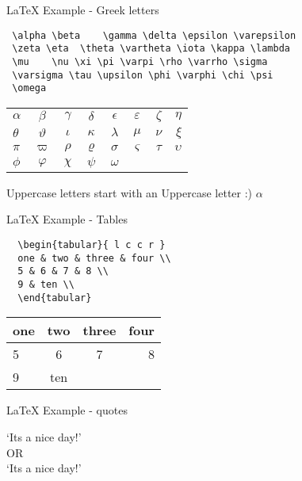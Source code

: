 \begin{frame}[t,fragile]{LaTeX Example - Greek letters}

  \begin{lstlisting}
 \alpha \beta	 \gamma \delta \epsilon \varepsilon
 \zeta \eta	 \theta \vartheta \iota \kappa \lambda
 \mu	\nu \xi \pi \varpi \rho \varrho \sigma
 \varsigma \tau \upsilon \phi \varphi \chi \psi
 \omega
  \end{lstlisting}

\begin{tabular}{ l c c c c c c r }
  $\alpha$ & $\beta$ & $\gamma$ & $\delta$ & $\epsilon$ & $\varepsilon$ & $\zeta$ & $\eta$ \\
  $\theta$ & $\vartheta$ & $\iota$ & $\kappa$ & $\lambda$ & $\mu$ & $\nu$ & $\xi$ \\
  $\pi$ & $\varpi$ & $\rho$ & $\varrho$ & $\sigma$ & $\varsigma$ & $\tau$ & $\upsilon$ \\
  $\phi$ & $\varphi$ & $\chi$ & $\psi$ & $\omega$ \\
\end{tabular}

Uppercase letters start with an Uppercase letter :) $\alpha$

\end{frame}

\begin{frame}[t,fragile]{LaTeX Example - Tables}


\begin{lstlisting}
  \begin{tabular}{ l c c r }
  one & two & three & four \\
  5 & 6 & 7 & 8 \\
  9 & ten \\
  \end{tabular}
\end{lstlisting}

\begin{tabular}{ l | c || c r }
one & two & three & four \\ \hline
5 & 6 & 7 & 8 \\
9 & ten \\
\end{tabular}
\end{frame}

\begin{frame}[t,fragile]{LaTeX Example - quotes}

  `It\textquotesingle s a nice day!' \\
  OR \\
  `It{\textquotesingle}s a nice day!' \\

\end{frame}

